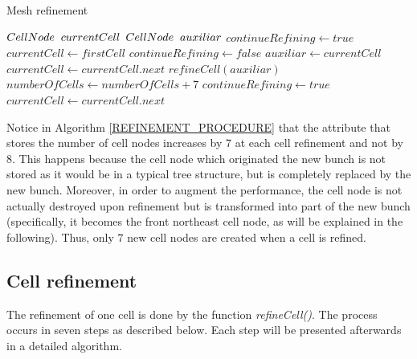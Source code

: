 \begin{algorithm}[!ht]
    \caption{Mesh refinement}
    \small{
    \begin{algorithmic}[1]
        \State $CellNode \hspace{2mm} currentCell$
        \State $CellNode \hspace{2mm} auxiliar$
        \State $continueRefining \gets true$
            \State $currentCell \gets firstCell$
            \State $continueRefining \gets false$
                    \State $auxiliar \gets currentCell$
                    \State $currentCell \gets currentCell.next $
                    \State $refineCell(auxiliar)$
                    \State $numberOfCells \gets numberOfCells + 7$
                    \State $continueRefining \gets true$
                \Else
                    \State$currentCell \gets currentCell.next$
                \EndIf
            \EndWhile
        \EndWhile
    \EndProcedure
    \end{algorithmic}
    }
    \label{REFINEMENT_PROCEDURE}
\end{algorithm}

Notice in Algorithm \ref{REFINEMENT_PROCEDURE} that the attribute
that stores the number of cell nodes increases by $7$ at each cell
refinement and not by $8$. This happens because the cell node which
originated the new bunch is not stored as it would be in a typical
tree structure, but is completely replaced by the new bunch.
Moreover, in order to augment the performance, the cell node is not
actually destroyed upon refinement but is transformed into part of
the new bunch (specifically, it becomes the front northeast cell
node, as will be explained in the following). Thus, only $7$ new
cell nodes are created when a cell is refined.

\subsection{Cell refinement} \label{SUBSEC_PROCEDURE_REF}
The refinement of one cell is done by the function
\textit{refineCell()}. The process occurs in seven steps as
described below. Each step will be presented afterwards in a
detailed algorithm.

